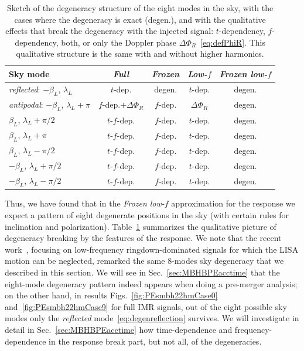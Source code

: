 \documentclass[aps,showpacs,twocolumn,prd,superscriptaddress,nofootinbib]{revtex4-1}
\newcommand\betaL{{\beta_{L}}}
\newcommand\lambdaL{{\lambda_{L}}}
\begin{document}
\begin{table}
	\begin{tabularx}{.48\textwidth}{|X||c|c|c|c|}
		\hline
		Sky mode & \textit{Full} & \textit{Frozen} & \textit{Low-$f$} & \textit{Frozen low-$f$} \\
		\hline
		\textit{reflected}: \newline $-\betaL$, $\lambdaL$ & $t$-dep. & degen. & $t$-dep. & degen.  \\
		\hline
		\textit{antipodal}: \newline $-\betaL$, $\lambdaL + \pi$ & $f$-dep.$+\Delta \Phi_{R}$ & $f$-dep. & $\Delta \Phi_{R}$ & degen.  \\
		\hline
		$\betaL$, $\lambdaL + \pi/2$ & $t$-$f$-dep. & $f$-dep. & $t$-dep. & degen.  \\
		\hline
		$\betaL$, $\lambdaL + \pi$ & $t$-$f$-dep. & $f$-dep. & $t$-dep. & degen.  \\
		\hline
		$\betaL$, $\lambdaL - \pi/2$ & $t$-$f$-dep. & $f$-dep. & $t$-dep. & degen.  \\
		\hline
		$-\betaL$, $\lambdaL + \pi/2$ & $t$-$f$-dep. & $f$-dep. & $t$-dep. & degen.  \\
		\hline
		$-\betaL$, $\lambdaL - \pi/2$ & $t$-$f$-dep. & $f$-dep. & $t$-dep. & degen.  \\
		\hline
	\end{tabularx}
	\caption{Sketch of the degeneracy structure of the eight modes in the sky, with the cases where the degeneracy is exact (degen.), and with the qualitative effects that break the degeneracy with the injected signal: $t$-dependency, $f$-dependency, both, or only the Doppler phase $\Delta \Phi_{R}$~\eqref{eq:defPhiR}. This qualitative structure is the same with and without higher harmonics.}
	\label{tab:MBHBdegen}
\end{table}

Thus, we have found that in the \textit{Frozen low-$f$} approximation for the response we expect a pattern of eight degenerate positions in the sky (with certain rules for inclination and polarization). Table~\ref{tab:MBHBdegen} summarizes the qualitative picture of degeneracy breaking by the features of the response. We note that the recent work~\cite{Baibhav+20}, focusing on low-frequency ringdown-dominated signals for which the LISA motion can be neglected, remarked the same 8-modes sky degeneracy that we described in this section. We will see in Sec.~\ref{sec:MBHBPEacctime} that the eight-mode degeneracy pattern indeed appears when doing a pre-merger analysis; on the other hand, in results Figs.~\ref{fig:PEsmbh22hmCase0} and~\ref{fig:PEsmbh22hmCase9} for full IMR signals, out of the eight possible sky modes only the \textit{reflected} mode~\eqref{eq:degenreflection} survives. We will investigate in detail in Sec.~\ref{sec:MBHBPEacctime} how time-dependence and frequency-dependence in the response break part, but not all, of the degeneracies.
\end{document}
